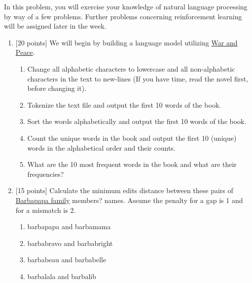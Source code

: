 \documentclass[12pt]{article}
\newenvironment{problem}[2][Problem:]{\begin{trivlist}
\item[\hskip \labelsep {\bfseries #1}\hskip \labelsep {\bfseries #2.}]}{\end{trivlist}}
\begin{document}
\begin{problem}{Natural Language Processing [50 points]}
In this problem, you will exercise your knowledge of natural language processing by way of a few problems.
Further problems concerning reinforcement learning will be assigned later in the week. 

\begin{enumerate}
    \item {[20 points]} 
    We will begin by building a language model utilizing 
    \href{https://canvas.dartmouth.edu/files/3206548/download?download_frd=1}{War and Peace}.
    \begin{enumerate}
            \item Change all alphabetic characters to lowercase and all non-alphabetic characters in the text to new-lines 
            	(If you have time, read the novel first, before changing it).
	\item Tokenize the text file and output the first 10 words of the book.
	\item Sort the words alphabetically and output the first 10 words of the book.
	\item Count the unique words in the book and output the first 10 (unique) words in the alphabetical order and their counts.
	\item What are the 10 most frequent words in the book and what are their frequencies?
    \end{enumerate}

    \item {[15 points]}
    Calculate the minimum edits distance between these pairs of 
    \href{http://www.barbapapa.com/the-barbapa-family-en/}{Barbapapa family} members? names. 
    Assume the penalty for a gap is 1 and for a mismatch is 2.
    \begin{enumerate} 
    	\item barbapapa and barbamama 
    	\item barbabravo and barbabright 
    	\item barbabeau and barbabelle 
    	\item barbalala and barbalib
    \end{enumerate}


\end{enumerate}
\end{problem}
\end{document}
